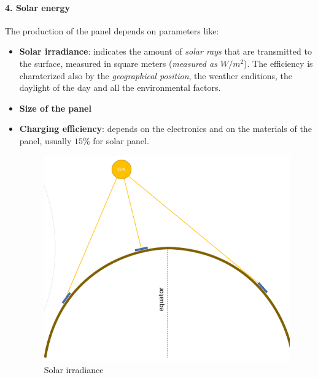 \documentclass[10pt,a4paper]{report}
\theoremstyle{definition}
\begin{document}
\paragraph{4. Solar energy}\label{sec:4-solar-energy}
The production of the panel depends on parameters like:
\begin{itemize}
	\item 
	\textbf{Solar irradiance}:  indicates the amount of \textit{solar rays} that are transmitted to the surface, measured in square meters (\textit{measured as $W/m^{2}$}). The efficiency is charaterized also by the \textit{geographical position}, the weather cnditions, the daylight of the day and all the environmental factors.
	\item 
	\textbf{Size of the panel}
	\item 
	\textbf{Charging efficiency}: depends on the electronics and on the materials of the panel, usually $15\%$ for solar panel.
	\begin{figure}
		\centering\includegraphics[scale=0.50]{images/Pasted image 20230506082624.png}
		\caption{Solar irradiance}
	\end{figure}
	
\end{itemize}
\end{document}
